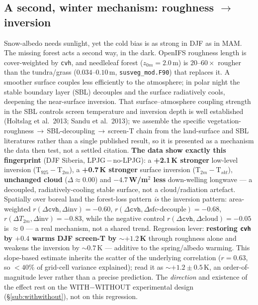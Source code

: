 \documentclass[10pt]{article}
\begin{document}
\subsection{A second, winter mechanism: roughness $\to$ inversion}\label{sub:roughness}
Snow-albedo needs sunlight, yet the cold bias is as strong in DJF as in MAM. The missing forest acts a second way,
in the dark. OpenIFS roughness length is cover-weighted by \texttt{cvh}, and needleleaf forest ($z_{0m}=2.0$\,m) is
$20$--$60\times$ rougher than the tundra/grass ($0.034$--$0.10$\,m, \texttt{susveg\_mod.F90}) that replaces it. A
smoother surface couples less efficiently to the atmosphere; in polar night the stable boundary layer (SBL) decouples
and the surface radiatively cools, deepening the near-surface inversion. That surface--atmosphere coupling strength in
the SBL controls screen temperature and inversion depth is well established (Holtslag et al.\ 2013; Sandu et al.\
2013); we assemble the specific vegetation-roughness\,$\to$\,SBL-decoupling\,$\to$\,screen-T chain from the
land-surface and SBL literatures rather than a single published result, so it is presented as a mechanism the data
then test, not a settled citation. \textbf{The data show exactly this fingerprint}
(DJF Siberia, LPJG\,$-$\,no-LPJG): a \textbf{+2.1\,K stronger} low-level inversion (T$_{925}-$T$_{2m}$), a
\textbf{+0.7\,K stronger} surface inversion (T$_{2m}-$T$_{skt}$), \textbf{unchanged cloud} ($\Delta\approx0.00$) and
\textbf{$-4.7$\,W/m$^2$ less} down-welling longwave --- a decoupled, radiatively-cooling stable surface, not a
cloud/radiation artefact. Spatially over boreal land the forest-loss pattern \emph{is} the inversion pattern:
area-weighted $r(\Delta\texttt{cvh},\Delta\text{inv})=-0.60$, $r(\Delta\texttt{cvh},\Delta\text{sfc-decouple})=-0.68$,
$r(\Delta T_{2m},\Delta\text{inv})=-0.83$, while the negative control $r(\Delta\texttt{cvh},\Delta\text{cloud})=-0.05$
is $\approx0$ --- a real mechanism, not a shared trend. Regression lever: \textbf{restoring \texttt{cvh} by $+0.4$
warms DJF screen-T by $\sim+1.2$\,K} through roughness alone and weakens the inversion by $\sim0.7$\,K --- additive
to the spring/albedo warming. This slope-based estimate inherits the scatter of the underlying correlation
($r=0.63$, so $<40\%$ of grid-cell variance explained); read it as $\sim+1.2\pm0.5$\,K, an order-of-magnitude lever
rather than a precise prediction. The \emph{direction} and existence of the effect rest on the WITH$-$WITHOUT
experimental design (\S\ref{sub:withwithout}), not on this regression.
\end{document}

